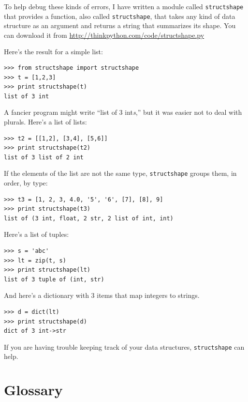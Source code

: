 \documentclass[10pt]{book}
\begin{document}

To help debug these kinds of errors, I have written a module
called {\tt structshape} that provides a function, also called
{\tt structshape}, that takes any kind of data structure as
an argument and returns a string that summarizes its shape.
You can download it from \url{http://thinkpython.com/code/structshape.py}

Here's the result for a simple list:

\begin{verbatim}
>>> from structshape import structshape
>>> t = [1,2,3]
>>> print structshape(t)
list of 3 int
\end{verbatim}
%
A fancier program might write ``list of 3 int{\em s},'' but it
was easier not to deal with plurals.  Here's a list of lists:

\begin{verbatim}
>>> t2 = [[1,2], [3,4], [5,6]]
>>> print structshape(t2)
list of 3 list of 2 int
\end{verbatim}
%
If the elements of the list are not the same type,
{\tt structshape} groups them, in order, by type:

\begin{verbatim}
>>> t3 = [1, 2, 3, 4.0, '5', '6', [7], [8], 9]
>>> print structshape(t3)
list of (3 int, float, 2 str, 2 list of int, int)
\end{verbatim}
%
Here's a list of tuples:

\begin{verbatim}
>>> s = 'abc'
>>> lt = zip(t, s)
>>> print structshape(lt)
list of 3 tuple of (int, str)
\end{verbatim}
%
And here's a dictionary with 3 items that map integers to strings.

\begin{verbatim}
>>> d = dict(lt) 
>>> print structshape(d)
dict of 3 int->str
\end{verbatim}
%
If you are having trouble keeping track of your data structures,
{\tt structshape} can help.


\section{Glossary}
\end{document}
